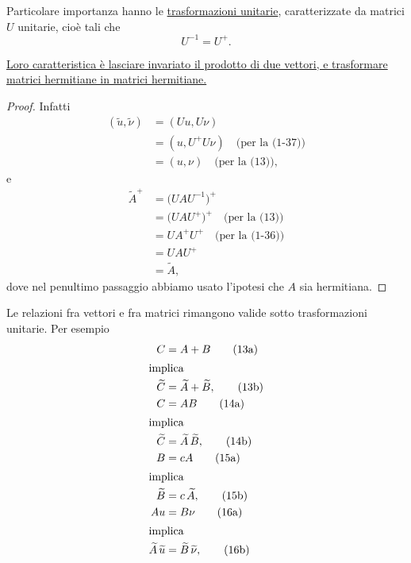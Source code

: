 \documentclass[11pt, a4paper]{book}
\numberwithin{equation}{section}
\begin{document}
Particolare importanza hanno le \underline{trasformazioni unitarie},
caratterizzate da matrici $U$ unitarie, cioè tali che
\begin{equation}
U^{-1} = U^+.
\end{equation}


\uline{Loro caratteristica è lasciare invariato il prodotto di due vettori,
e trasformare matrici hermitiane in matrici hermitiane.}

\begin{proof}
Infatti
\begin{align*}
(\widetilde{u}, \widetilde{\nu}) &= (Uu, U\nu) \\
  &= (u, U^+ U\nu) \quad \text{(per la (1-37))} \\
  &= (u, \nu)       \quad \text{(per la (13))},
\end{align*}
e
\begin{align*}
\widetilde{A}^+ &= \bigl(U A U^{-1}\bigr)^+ \\
  &= \bigl(U A U^+\bigr)^+   \quad \text{(per la (13))} \\
  &= U A^+ U^+               \quad \text{(per la (1-36))} \\
  &= U A U^+                                              \\
  &= \widetilde{A},
\end{align*}
dove nel penultimo passaggio abbiamo usato l'ipotesi che $A$ sia
hermitiana.
\end{proof}

Le relazioni fra vettori e fra matrici rimangono valide sotto
trasformazioni unitarie. Per esempio
\begin{align}
C &= A + B  \tag{13a} \\
\shortintertext{implica}
\widetilde{C} &= \widetilde{A} + \widetilde{B}, \tag{13b} \\
C &= AB     \tag{14a} \\
\shortintertext{implica}
\widetilde{C} &= \widetilde{A}\,\widetilde{B}, \tag{14b} \\
B &= cA     \tag{15a} \\
\shortintertext{implica}
\widetilde{B} &= c\,\widetilde{A}, \tag{15b} \\
Au &= B\nu  \tag{16a} \\
\shortintertext{implica}
\widetilde{A}\,\widetilde{u} &= \widetilde{B}\,\widetilde{\nu}, \tag{16b}
\end{align}
\end{document}
